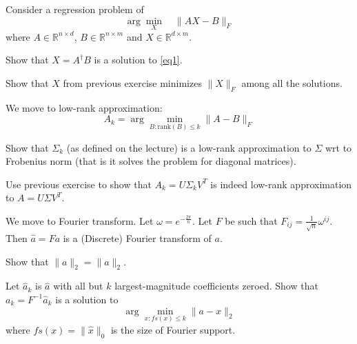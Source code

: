 \documentclass[12pt]{uebung}
\begin{document}
 

\newcommand{\bigo}{\mathcal{O}}
\renewcommand{\aufgname}{Exercise}

Consider a regression problem of 
\begin{equation}
\label{eq1}
\arg \min_{X}\quad \|AX - B\|_F
\end{equation}
where $A \in \mathbb{R}^{n \times d}$, $B \in \mathbb{R}^{n \times m}$ and $X \in \mathbb{R}^{d \times m}$.

\begin{aufg}
Show that $X = A^\dagger B$ is a solution to \eqref{eq1}.
\end{aufg}
\begin{aufg}
Show that $X$ from previous exercise minimizes $\|X\|_F$ among all the solutions.
\end{aufg}

\vspace{2cm}
We move to low-rank approximation:
$$A_k = \arg \min_{B : \text{rank}(B) \le k} \|A - B\|_F$$
\begin{aufg}
Show that $\Sigma_k$ (as defined on the lecture) is a low-rank approximation to $\Sigma$ wrt to Frobenius norm (that is it solves the problem for diagonal matrices).
\end{aufg}
\begin{aufg}
Use previous exercise to show that $A_k = U \Sigma_k V^T$ is indeed low-rank approximation to $A = U \Sigma V^T$.
\end{aufg}

\vspace{2cm}

We move to Fourier transform. Let $\omega = e^{-\frac{2 \pi}{n}}$. Let $F$ be such that $F_{ij} = \frac{1}{\sqrt{n}}\omega^{ij}$. Then $\hat{a} = F a$ is a (Discrete) Fourier transform of $a$.

\begin{aufg}
Show that $\|a\|_2 = \|\hat{a}\|_2$.
\end{aufg}

\begin{aufg}
Let $\hat{a}_k$ is $\hat{a}$ with all but $k$ largest-magnitude coefficients zeroed. Show that $a_k = F^{-1} \hat{a}_k$ is a solution to
$$\arg \min_{x : fs(x) \le k} \|a - x\|_2$$
where $fs(x) = \|\hat{x}\|_0$ is the size of Fourier support.
\end{aufg}
\end{document}
